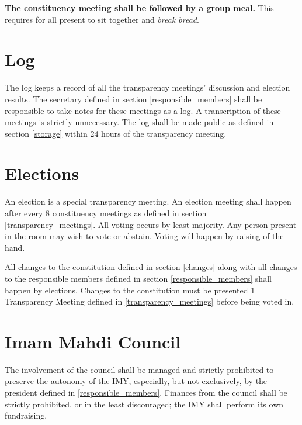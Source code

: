 \documentclass{article}
\begin{document}
\textbf{The constituency meeting shall be followed by a group meal. }
This requires for all present to sit together and \textit{break bread}.

\section{Log}
\label{log}
The log keeps a record of all the transparency meetings' discussion and election results.
The secretary defined in section \ref{responsible_members} shall be responsible to take notes for these meetings as a log.
A transcription of these meetings is strictly unnecessary.
The log shall be made public as defined in section \ref{storage} within
24
hours of the transparency meeting.

\section{Elections}
\label{elections}
An election is a special transparency meeting.
An election meeting shall happen after every
8
constituency meetings as defined in section \ref{transparency_meetings}.
All voting occurs by least majority.
Any person present in the room may wish to vote or abstain.
Voting will happen by raising of the hand.

\label{required_voting}
All changes to the constitution defined in section \ref{changes}
along with all changes to the responsible members defined in section \ref{responsible_members} shall happen by elections.
Changes to the constitution must be presented
1
Transparency Meeting defined in \ref{transparency_meetings}
before being voted in.

\section{Imam Mahdi Council}
\label{council}
The involvement of the council shall be managed and strictly prohibited to preserve the autonomy of the IMY, especially, but not exclusively, by the president defined in \ref{responsible_members}.
Finances from the council shall be strictly prohibited, or in the least discouraged; the IMY shall perform its own fundraising.


\end{document}
